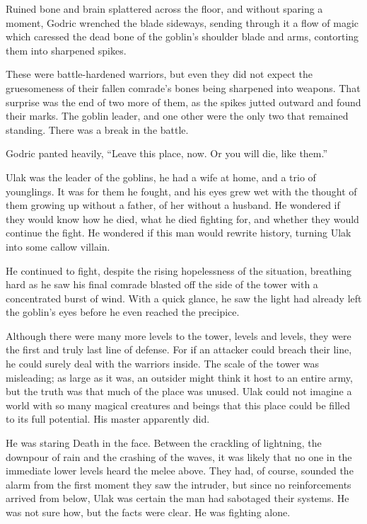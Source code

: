 Ruined bone and brain splattered across the floor, and without sparing a moment, Godric wrenched the blade sideways, sending through it a flow of magic which caressed the dead bone of the goblin’s shoulder blade and arms, contorting them into sharpened spikes.

These were battle-hardened warriors, but even they did not expect the gruesomeness of their fallen comrade’s bones being sharpened into weapons. That surprise was the end of two more of them, as the spikes jutted outward and found their marks. The goblin leader, and one other were the only two that remained standing. There was a break in the battle.

Godric panted heavily, “Leave this place, now. Or you will die, like them.”

Ulak was the leader of the goblins, he had a wife at home, and a trio of younglings. It was for them he fought, and his eyes grew wet with the thought of them growing up without a father, of her without a husband. He wondered if they would know how he died, what he died fighting for, and whether they would continue the fight. He wondered if this man would rewrite history, turning Ulak into some callow villain.

He continued to fight, despite the rising hopelessness of the situation, breathing hard as he saw his final comrade blasted off the side of the tower with a concentrated burst of wind. With a quick glance, he saw the light had already left the goblin’s eyes before he even reached the precipice.

Although there were many more levels to the tower, levels and levels, they were the first and truly last line of defense. For if an attacker could breach their line, he could surely deal with the warriors inside. The scale of the tower was misleading; as large as it was, an outsider might think it host to an entire army, but the truth was that much of the place was unused. Ulak could not imagine a world with so many magical creatures and beings that this place could be filled to its full potential. His master apparently did.

He was staring Death in the face. Between the crackling of lightning, the downpour of rain and the crashing of the waves, it was likely that no one in the immediate lower levels heard the melee above. They had, of course, sounded the alarm from the first moment they saw the intruder, but since no reinforcements arrived from below, Ulak was certain the man had sabotaged their systems. He was not sure how, but the facts were clear. He was fighting alone.

